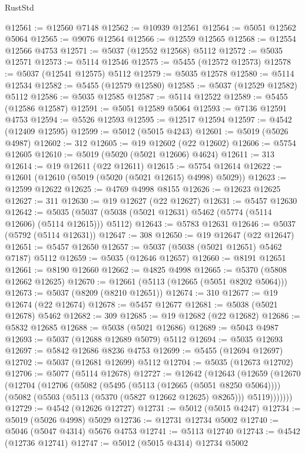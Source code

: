 \begin{lexlean}{RustStd}
\begin{coremodule}
@12561 := @12560 @7148
@12562 := @10939 @12561
@12564 := @5051 @12562 @5064
@12565 := @9076 @12564
@12566 := @12559 @12565
@12568 := @12554 @12566 @4753
@12571 := @5037 (@12552 @12568) @5112
@12572 := @5035 @12571
@12573 := @5114 @12546
@12575 := @5455 (@12572 @12573)
@12578 := @5037 (@12541 @12575) @5112
@12579 := @5035 @12578
@12580 := @5114 @12534
@12582 := @5455 (@12579 @12580)
@12585 := @5037 (@12529 @12582) @5112
@12586 := @5035 @12585
@12587 := @5114 @12522
@12589 := @5455 (@12586 @12587)
@12591 := @5051 @12589 @5064
@12593 := @7136 @12591 @4753
@12594 := @5526 @12593
@12595 := @12517 @12594
@12597 := @4542 (@12409 @12595)
@12599 := @5012 (@5015 @4243)
@12601 := @5019 (@5026 @4987)
@12602 := 312
@12605 := @19 @12602 (@22 @12602)
@12606 := @5754 @12605
@12610 := @5019 (@5020 (@5021 @12606) @4624)
@12611 := 313
@12614 := @19 @12611 (@22 @12611)
@12615 := @5754 @12614
@12622 := @12601 (@12610 (@5019 (@5020 (@5021 @12615) @4998) @5029))
@12623 := @12599 @12622
@12625 := @4769 @4998 @8155
@12626 := @12623 @12625
@12627 := 311
@12630 := @19 @12627 (@22 @12627)
@12631 := @5457 @12630
@12642 := @5035 (@5037 (@5038 (@5021 @12631) @5462 (@5774 (@5114 @12606) (@5114 @12615))) @5112)
@12643 := @5783 @12631
@12646 := @5037 (@5792 (@5114 @12631))
@12647 := 308
@12650 := @19 @12647 (@22 @12647)
@12651 := @5457 @12650
@12657 := @5037 (@5038 (@5021 @12651) @5462 @7187) @5112
@12659 := @5035 (@12646 @12657)
@12660 := @8191 @12651
@12661 := @8190 @12660
@12662 := @4825 @4998
@12665 := @5370 (@5808 @12662 @12625)
@12670 := @12661 (@5113 (@12665 (@5051 @8202 @5064)))
@12673 := @5037 (@8209 (@8210 @12651))
@12674 := 310
@12677 := @19 @12674 (@22 @12674)
@12678 := @5457 @12677
@12681 := @5038 (@5021 @12678) @5462
@12682 := 309
@12685 := @19 @12682 (@22 @12682)
@12686 := @5832 @12685
@12688 := @5038 (@5021 @12686)
@12689 := @5043 @4987
@12693 := @5037 (@12688 @12689 @5079) @5112
@12694 := @5035 @12693
@12697 := @5842 @12686 @8236 @4753
@12699 := @5455 (@12694 @12697)
@12702 := @5037 (@12681 @12699) @5112
@12704 := @5035 (@12673 @12702)
@12706 := @5077 (@5114 @12678)
@12727 := @12642
    (@12643
      (@12659
        (@12670
          (@12704
            (@12706
              (@5082
                (@5495 (@5113 (@12665 (@5051 @8250 @5064))))
                (@5082 (@5503 (@5113 (@5370 (@5827 @12662 @12625) @8265))) @5119)))))))
@12729 := @4542 (@12626 @12727)
@12731 := @5012 (@5015 @4247)
@12734 := @5019 (@5026 @4998) @5029
@12736 := @12731 @12734 @5002
@12740 := @5046 (@5047 @4314) @5676 @4753
@12741 := @5113 @12740
@12743 := @4542 (@12736 @12741)
@12747 := @5012 (@5015 @4314) @12734 @5002

\end{coremodule}
\end{lexlean}
